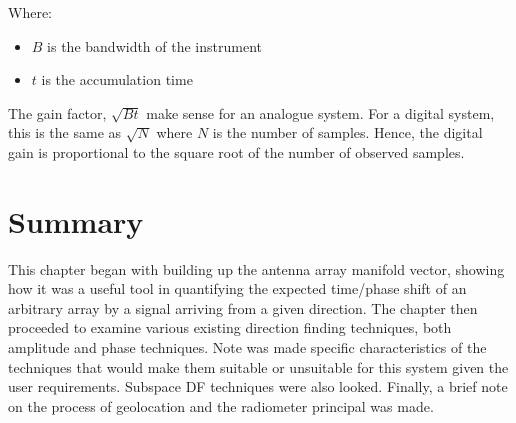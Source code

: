 Where:
\begin{itemize}
  \item \(B\) is the bandwidth of the instrument
  \item \(t\) is the accumulation time
\end{itemize}

The gain factor, \(\sqrt{Bt}\) make sense for an analogue system. For a digital system, this is the same as \(\sqrt{N}\) where \(N\) is the number of samples. Hence, the digital gain is proportional to the square root of the number of observed samples.

\section{Summary}
This chapter began with building up the antenna array manifold vector, showing how it was a useful tool in quantifying the expected time/phase shift of an arbitrary array by a signal arriving from a given direction. The chapter then proceeded to examine various existing direction finding techniques, both amplitude and phase techniques. Note was made specific characteristics of the techniques that would make them suitable or unsuitable for this system given the user requirements. Subspace DF techniques were also looked. Finally, a brief note on the process of geolocation and the radiometer principal was made.
